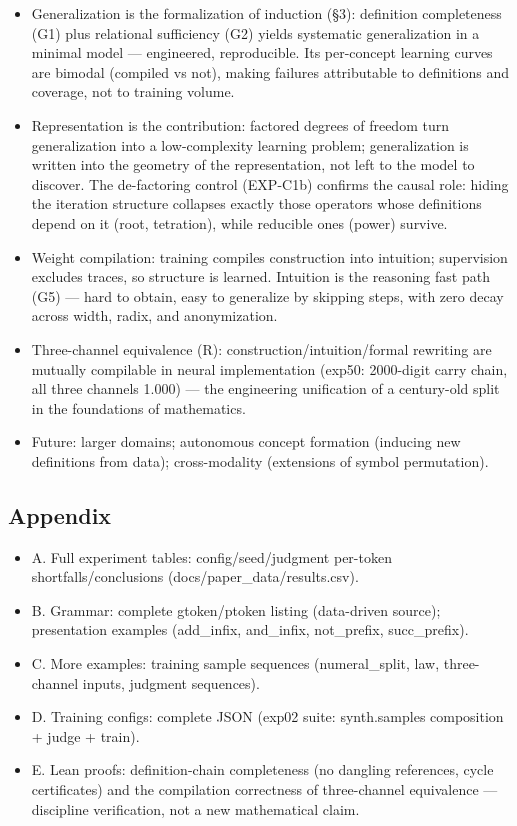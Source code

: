\documentclass[
]{article}
\providecommand{\tightlist}{%
  \setlength{\itemsep}{0pt}\setlength{\parskip}{0pt}}
\begin{document}
\begin{itemize}
\tightlist
\item
  Generalization is the formalization of induction (§3): definition
  completeness (G1) plus relational sufficiency (G2) yields systematic
  generalization in a minimal model --- engineered, reproducible. Its
  per-concept learning curves are bimodal (compiled vs not), making
  failures attributable to definitions and coverage, not to training
  volume.
\item
  Representation is the contribution: factored degrees of freedom turn
  generalization into a low-complexity learning problem; generalization
  is written into the geometry of the representation, not left to the
  model to discover. The de-factoring control (EXP-C1b) confirms the
  causal role: hiding the iteration structure collapses exactly those
  operators whose definitions depend on it (root, tetration), while
  reducible ones (power) survive.
\item
  Weight compilation: training compiles construction into intuition;
  supervision excludes traces, so structure is learned. Intuition is the
  reasoning fast path (G5) --- hard to obtain, easy to generalize by
  skipping steps, with zero decay across width, radix, and
  anonymization.
\item
  Three-channel equivalence (R): construction/intuition/formal rewriting
  are mutually compilable in neural implementation (exp50: 2000-digit
  carry chain, all three channels 1.000) --- the engineering unification
  of a century-old split in the foundations of mathematics.
\item
  Future: larger domains; autonomous concept formation (inducing new
  definitions from data); cross-modality (extensions of symbol
  permutation).
\end{itemize}

\subsection{Appendix}\label{appendix}

\begin{itemize}
\tightlist
\item
  A. Full experiment tables: config/seed/judgment per-token
  shortfalls/conclusions (docs/paper\_data/results.csv).
\item
  B. Grammar: complete gtoken/ptoken listing (data-driven source);
  presentation examples (add\_infix, and\_infix, not\_prefix,
  succ\_prefix).
\item
  C. More examples: training sample sequences (numeral\_split, law,
  three-channel inputs, judgment sequences).
\item
  D. Training configs: complete JSON (exp02 suite: synth.samples
  composition + judge + train).
\item
  E. Lean proofs: definition-chain completeness (no dangling references,
  cycle certificates) and the compilation correctness of three-channel
  equivalence --- discipline verification, not a new mathematical claim.
\end{itemize}
\end{document}
